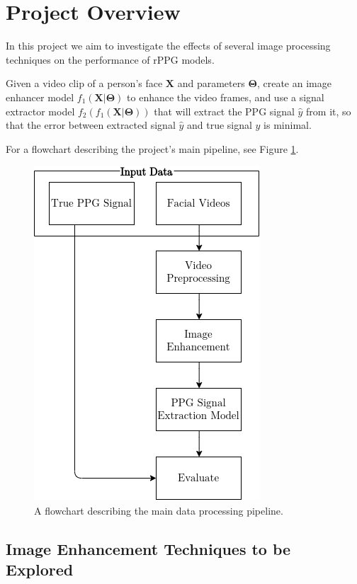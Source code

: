 \documentclass{article}
\begin{document}
\section*{Project Overview}

In this project we aim to investigate the effects of several image processing techniques on the performance of rPPG models.

Given a video clip of a person’s face $\mathbf{X}$ and parameters $\mathbf{\Theta}$, create an image enhancer model $f_{1}(\mathbf{X} | \mathbf{\Theta})$ to enhance the video frames, and use a signal extractor model $f_{2}(f_{1}(\mathbf{X} | \mathbf{\Theta}))$ that will extract the PPG signal $\hat{y}$ from it, so that the error between extracted signal $\hat{y}$ and true signal $y$ is minimal.

For a flowchart describing the project's main pipeline, see Figure \ref{fig:flowchart}.

\begin{figure}[H]
	\includegraphics[scale=0.45, center]{figures/flowchart.png}
	\caption{A flowchart describing the main data processing pipeline.}
	\label{fig:flowchart}
\end{figure}

\subsection*{Image Enhancement Techniques to be Explored}
\end{document}

